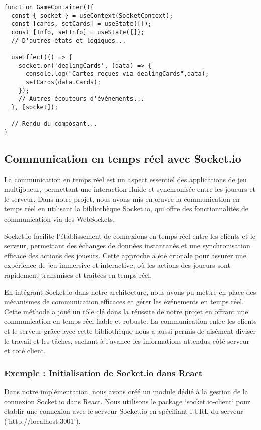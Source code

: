 \documentclass[a4paper]{article}
\begin{document}
\begin{verbatim}
function GameContainer(){
  const { socket } = useContext(SocketContext);
  const [cards, setCards] = useState([]);
  const [Info, setInfo] = useState([]);
  // D'autres états et logiques...
  
  useEffect(() => {
    socket.on('dealingCards', (data) => {
      console.log("Cartes reçues via dealingCards",data);
      setCards(data.Cards);
    });
    // Autres écouteurs d'événements...
  }, [socket]);

  // Rendu du composant...
}
\end{verbatim}

\subsection{Communication en temps réel avec Socket.io}

La communication en temps réel est un aspect essentiel des applications de jeu multijoueur, permettant une interaction fluide et synchronisée entre les joueurs et le serveur. Dans notre projet, nous avons mis en œuvre la communication en temps réel en utilisant la bibliothèque Socket.io, qui offre des fonctionnalités de communication via des WebSockets.

Socket.io facilite l'établissement de connexions en temps réel entre les clients et le serveur, permettant des échanges de données instantanés et une synchronisation efficace des actions des joueurs. Cette approche a été cruciale pour assurer une expérience de jeu immersive et interactive, où les actions des joueurs sont rapidement transmises et traitées en temps réel.

En intégrant Socket.io dans notre architecture, nous avons pu mettre en place des mécanismes de communication efficaces et gérer les événements en temps réel. Cette méthode a joué un rôle clé dans la réussite de notre projet en offrant une communication en temps réel fiable et robuste. La communication entre les clients et le serveur grâce avec cette bibliothèque nous a aussi permis de aisément diviser le travail et les tâches, sachant à l'avance les informations attendus côté serveur et coté client.

\subsubsection{Exemple : Initialisation de Socket.io dans React}

Dans notre implémentation, nous avons créé un module dédié à la gestion de la connexion Socket.io dans React. Nous utilisons le package `socket.io-client` pour établir une connexion avec le serveur Socket.io en spécifiant l'URL du serveur ('http://localhost:3001').
\end{document}
